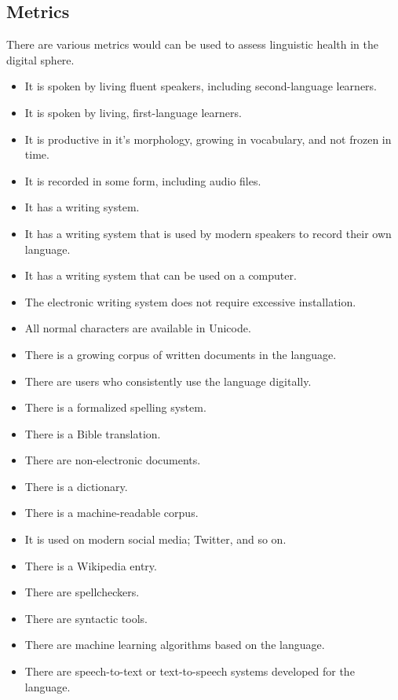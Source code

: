 \documentclass[10pt, a4paper]{article}
\begin{document}
\subsection{Metrics}

There are various metrics would can be used to assess linguistic health in the digital sphere.

\begin{itemize}
\item It is spoken by living fluent speakers, including second-language learners.
\item It is spoken by living, first-language learners.
\item It is productive in it's morphology, growing in vocabulary, and not frozen in time.
\item It is recorded in some form, including audio files.
\item It has a writing system.
\item It has a writing system that is used by modern speakers to record their own language.
\item It has a writing system that can be used on a computer.
\item The electronic writing system does not require excessive installation.
\item All normal characters are available in Unicode.
\item There is a growing corpus of written documents in the language.
\item There are users who consistently use the language digitally.
\item There is a formalized spelling system.
\item There is a Bible translation. %
\item There are non-electronic documents.
\item There is a dictionary.
\item There is a machine-readable corpus.
\item It is used on modern social media; Twitter, and so on.
\item There is a Wikipedia entry.
\item There are spellcheckers.
\item There are syntactic tools.
\item There are machine learning algorithms based on the language.
\item There are speech-to-text or text-to-speech systems developed for the language.
\end{itemize}
\end{document}
